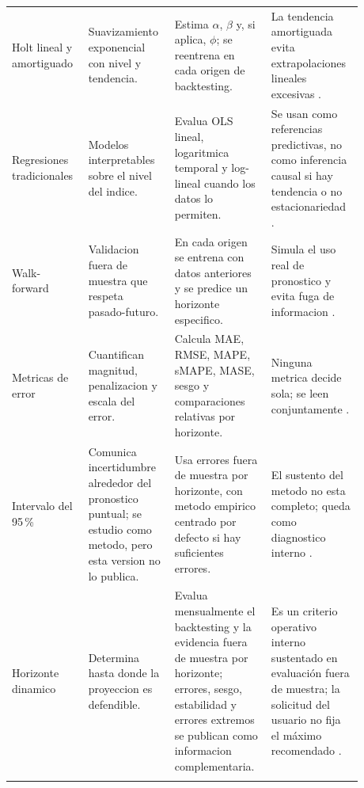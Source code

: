 ﻿\documentclass[12pt,letterpaper]{article}
\begin{document}
\begin{longtable}{p{0.18\linewidth}p{0.22\linewidth}p{0.24\linewidth}p{0.24\linewidth}}
\addlinespace
Holt lineal y amortiguado & Suavizamiento exponencial con nivel y tendencia. & Estima \(\alpha\), \(\beta\) y, si aplica, \(\phi\); se reentrena en cada origen de backtesting. & La tendencia amortiguada evita extrapolaciones lineales excesivas \citep{holt1957,hyndman2021fpp3}. \\
\addlinespace
Regresiones tradicionales & Modelos interpretables sobre el nivel del indice. & Evalua OLS lineal, logaritmica temporal y log-lineal cuando los datos lo permiten. & Se usan como referencias predictivas, no como inferencia causal si hay tendencia o no estacionariedad \citep{penn_state_stat501,springer_spurious_regressions}. \\
\addlinespace
Walk-forward & Validacion fuera de muestra que respeta pasado-futuro. & En cada origen se entrena con datos anteriores y se predice un horizonte especifico. & Simula el uso real de pronostico y evita fuga de informacion \citep{tashman2000}. \\
\addlinespace
Metricas de error & Cuantifican magnitud, penalizacion y escala del error. & Calcula MAE, RMSE, MAPE, sMAPE, MASE, sesgo y comparaciones relativas por horizonte. & Ninguna metrica decide sola; se leen conjuntamente \citep{hyndman_koehler2006}. \\
\addlinespace
Intervalo del 95\,\% & Comunica incertidumbre alrededor del pronostico puntual; se estudio como metodo, pero esta version no lo publica. & Usa errores fuera de muestra por horizonte, con metodo empirico centrado por defecto si hay suficientes errores. & El sustento del metodo no esta completo; queda como diagnostico interno \citep{hyndman2021fpp3}. \\
\addlinespace
Horizonte dinamico & Determina hasta donde la proyeccion es defendible. & Evalua mensualmente el backtesting y la evidencia fuera de muestra por horizonte; errores, sesgo, estabilidad y errores extremos se publican como informacion complementaria. & Es un criterio operativo interno sustentado en evaluación fuera de muestra; la solicitud del usuario no fija el máximo recomendado \citep{tashman2000}. \\
\addlinespace
\multicolumn{4}{p{0.92\linewidth}}{\footnotesize\textit{Fuente: Elaboración propia con base en \citet{tashman2000}, \citet{hyndman2021fpp3}, \citet{hyndman_koehler2006} e \citet{nist_outliers}.}}\\
\bottomrule
\end{longtable}
\par\normalsize
\end{document}

